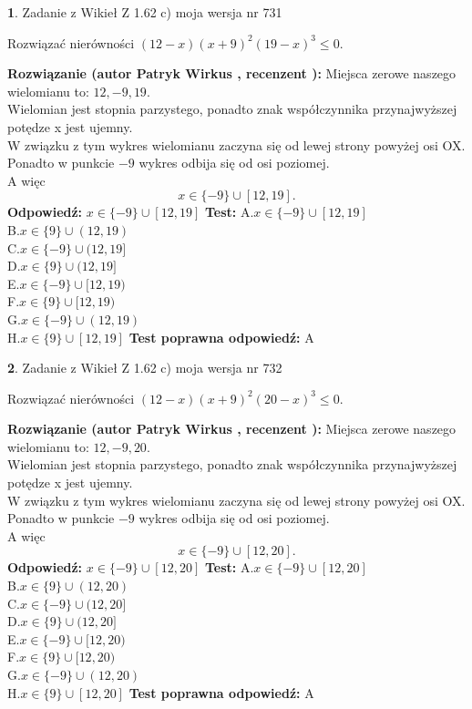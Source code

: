 \documentclass[12pt, a4paper]{article}
\theoremstyle{definition} %
\newtheorem{zad}{}
\newcommand{\zadStart}[1]{\begin{zad}#1\newline}
\newcommand{\zadStop}{\end{zad}}
\newcommand{\rozwStart}[2]{\noindent \textbf{Rozwiązanie (autor #1 , recenzent #2): }\newline}
\newcommand{\rozwStop}{\newline}
\newcommand{\odpStart}{\noindent \textbf{Odpowiedź:}\newline}
\newcommand{\odpStop}{\newline}
\newcommand{\testStart}{\noindent \textbf{Test:}\newline}
\newcommand{\testStop}{\newline}
\newcommand{\kluczStart}{\noindent \textbf{Test poprawna odpowiedź:}\newline}
\newcommand{\kluczStop}{\newline}
\begin{document}
\zadStart{Zadanie z Wikieł Z 1.62 c) moja wersja nr 731}

Rozwiązać nierówności $(12-x)(x+9)^{2}(19-x)^{3}\le0$.
\zadStop
\rozwStart{Patryk Wirkus}{}
Miejsca zerowe naszego wielomianu to: $12, -9, 19$.\\
Wielomian jest stopnia parzystego, ponadto znak współczynnika przy\linebreak najwyższej potędze x jest ujemny.\\ W związku z tym wykres wielomianu zaczyna się od lewej strony powyżej osi OX.\\
Ponadto w punkcie $-9$ wykres odbija się od osi poziomej.\\
A więc $$x \in \{-9\} \cup [12,19].$$
\rozwStop
\odpStart
$x \in \{-9\} \cup [12,19]$
\odpStop
\testStart
A.$x \in \{-9\} \cup [12,19]$\\
B.$x \in \{9\} \cup (12,19)$\\
C.$x \in \{-9\} \cup (12,19]$\\
D.$x \in \{9\} \cup (12,19]$\\
E.$x \in \{-9\} \cup [12,19)$\\
F.$x \in \{9\} \cup [12,19)$\\
G.$x \in \{-9\} \cup (12,19)$\\
H.$x \in \{9\} \cup [12,19]$
\testStop
\kluczStart
A
\kluczStop



\zadStart{Zadanie z Wikieł Z 1.62 c) moja wersja nr 732}

Rozwiązać nierówności $(12-x)(x+9)^{2}(20-x)^{3}\le0$.
\zadStop
\rozwStart{Patryk Wirkus}{}
Miejsca zerowe naszego wielomianu to: $12, -9, 20$.\\
Wielomian jest stopnia parzystego, ponadto znak współczynnika przy\linebreak najwyższej potędze x jest ujemny.\\ W związku z tym wykres wielomianu zaczyna się od lewej strony powyżej osi OX.\\
Ponadto w punkcie $-9$ wykres odbija się od osi poziomej.\\
A więc $$x \in \{-9\} \cup [12,20].$$
\rozwStop
\odpStart
$x \in \{-9\} \cup [12,20]$
\odpStop
\testStart
A.$x \in \{-9\} \cup [12,20]$\\
B.$x \in \{9\} \cup (12,20)$\\
C.$x \in \{-9\} \cup (12,20]$\\
D.$x \in \{9\} \cup (12,20]$\\
E.$x \in \{-9\} \cup [12,20)$\\
F.$x \in \{9\} \cup [12,20)$\\
G.$x \in \{-9\} \cup (12,20)$\\
H.$x \in \{9\} \cup [12,20]$
\testStop
\kluczStart
A
\kluczStop
\end{document}
